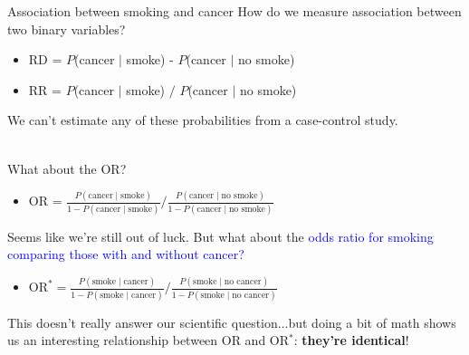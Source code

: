 \documentclass[10pt,t]{beamer}
\begin{document}
\begin{frame}{Association between smoking and cancer}
	\vspace{-0.5cm}
	How do we measure association between two binary variables?  
	\begin{itemize}
		\item RD = $P$(cancer $\mid$ smoke) -  $P$(cancer $\mid$ no smoke) 
		\item RR = $P$(cancer $\mid$ smoke) $/$ $P$(cancer $\mid$ no smoke)
	\end{itemize}
	We can't estimate any of these probabilities from a case-control study.  
	\\ ~\
	
	What about the OR?
	\begin{itemize}
		\item OR = $\frac{P(\text{cancer} \mid \text{smoke})}{1 - P(\text{cancer} \mid \text{smoke})} / \frac{P(\text{cancer} \mid \text{no smoke})}{1 - P(\text{cancer} \mid \text{no smoke})}$
	\end{itemize}
	\vspace{0.2cm} 
	Seems like we're still out of luck. But what about the \textcolor{blue}{odds ratio for smoking comparing those with and without cancer?}
	\begin{itemize}
		\item $\text{OR}^* = \frac{P(\text{smoke} \mid \text{cancer})}{1 - P(\text{smoke} \mid \text{cancer})} / \frac{P(\text{smoke} \mid \text{no cancer})}{1 - P(\text{smoke} \mid \text{no cancer})}$
	\end{itemize}
	\vspace{0.2cm} 
	This doesn't really answer our scientific question...but doing a bit of math shows us an interesting relationship between OR and OR$^*$: \textbf{they're identical}!
\end{frame}
\end{document}
